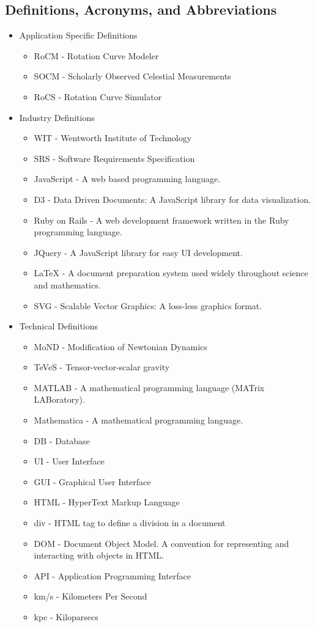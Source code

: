 \documentclass[titlepage]{article}
\begin{document}
\subsection{Definitions, Acronyms, and Abbreviations}
\begin{itemize}
	\item Application Specific Definitions
	\begin{itemize}
		\item RoCM - Rotation Curve Modeler
		\item SOCM - Scholarly Observed Celestial Measurements
		\item RoCS - Rotation Curve Simulator
	\end{itemize}
	\item Industry Definitions
	\begin{itemize}
		\item WIT - Wentworth Institute of Technology
		\item SRS - Software Requirements Specification
		\item JavaScript - A web based programming language.
		\item D3 - Data Driven Documents: A JavaScript library for data visualization.
		\item Ruby on Rails - A web development framework written in the Ruby programming language.
		\item JQuery - A JavaScript library for easy UI development.
		\item LaTeX - A document preparation system used widely throughout science and mathematics.
		\item SVG - Scalable Vector Graphics: A loss-less graphics format.
	\end{itemize}
	\item Technical Definitions
	\begin{itemize}
        \item MoND - Modification of Newtonian Dynamics
		\item TeVeS - Tensor-vector-scalar gravity
		\item MATLAB - A mathematical programming language (MATrix LABoratory).
		\item Mathematica - A mathematical programming language.
		\item DB - Database
        \item UI - User Interface
		\item GUI - Graphical User Interface
		\item HTML - HyperText Markup Language
		\item div - HTML tag to define a division in a document
        \item DOM - Document Object Model. A convention for representing and interacting with objects in HTML.
        \item API - Application Programming Interface
        \item km/s - Kilometers Per Second
        \item kpc - Kiloparsecs
	\end{itemize}
\end{itemize}
\end{document}
